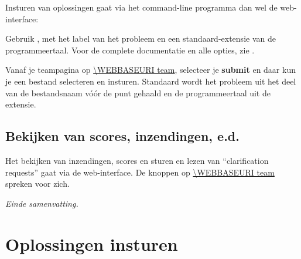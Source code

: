 Insturen van oplossingen gaat via het command-line programma
 dan wel de web-interface:
\begin{description}[\breaklabel\setlabelstyle{\bfseries}]
\item[Command-line] 
Gebruik , met  het
label van het probleem en  een standaard-extensie van
de programmeertaal. Voor de complete documentatie en alle opties, zie .
\item[Web-Interface]
Vanaf je teampagina op \url{\WEBBASEURI team}, selecteer je
\textbf{submit} en daar kun je een bestand selecteren en insturen.
Standaard wordt het probleem uit het deel van de bestandsnaam v\'o\'or de
punt gehaald en de programmeertaal uit de extensie.

\end{description}

\subsection*{Bekijken van scores, inzendingen, e.d.}

Het bekijken van inzendingen, scores en sturen en lezen van
``clarification requests'' gaat via de web-interface. De knoppen op
\url{\WEBBASEURI team} spreken voor zich.

\emph{Einde samenvatting.}

\newpage

\section{Oplossingen insturen}\label{submit}


